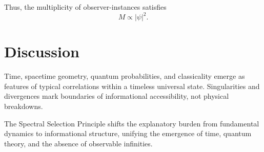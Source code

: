 \documentclass[11pt]{article}
\begin{document}
Thus, the multiplicity of observer-instances satisfies
\[
M \propto |\psi|^2.
\]

\section{Discussion}

Time, spacetime geometry, quantum probabilities, and classicality emerge as features
of typical correlations within a timeless universal state.
Singularities and divergences mark boundaries of informational accessibility,
not physical breakdowns.

The Spectral Selection Principle shifts the explanatory burden from fundamental dynamics
to informational structure, unifying the emergence of time, quantum theory,
and the absence of observable infinities.

\printbibliography
\end{document}
